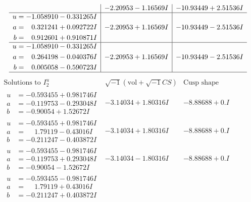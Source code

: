 \documentclass[1p]{elsarticle_modified}
\theoremstyle{definition}
\newcommand{\I}{\sqrt{-1}}
\begin{document}
$$\begin{array}{c|c|c}
 & -2.20953 - 1.16569 I & -10.93449 + 2.51536 I \\ \hline\begin{aligned}
u &= -1.058910 - 0.331265 I \\
a &= \phantom{-}0.321241 + 0.092722 I \\
b &= \phantom{-}0.912601 + 0.910871 I\end{aligned}
 & -2.20953 + 1.16569 I & -10.93449 - 2.51536 I \\ \hline\begin{aligned}
u &= -1.058910 - 0.331265 I \\
a &= \phantom{-}0.264198 - 0.040376 I \\
b &= \phantom{-}0.005058 - 0.590723 I\end{aligned}
 & -2.20953 + 1.16569 I & -10.93449 - 2.51536 I\\
 \hline 
 \end{array}$$\newpage$$\begin{array}{c|c|c}  
\text{Solutions to }I^u_{2}& \I (\text{vol} + \sqrt{-1}CS) & \text{Cusp shape}\\
 \hline 
\begin{aligned}
u &= -0.593455 + 0.981746 I \\
a &= -0.119753 - 0.293048 I \\
b &= -0.90054 + 1.52672 I\end{aligned}
 & -3.14034 + 1.80316 I & -8.88688 + 0. I\phantom{ +0.000000I} \\ \hline\begin{aligned}
u &= -0.593455 + 0.981746 I \\
a &= \phantom{-}1.79119 - 0.43016 I \\
b &= -0.211247 - 0.403872 I\end{aligned}
 & -3.14034 + 1.80316 I & -8.88688 + 0. I\phantom{ +0.000000I} \\ \hline\begin{aligned}
u &= -0.593455 - 0.981746 I \\
a &= -0.119753 + 0.293048 I \\
b &= -0.90054 - 1.52672 I\end{aligned}
 & -3.14034 - 1.80316 I & -8.88688 + 0. I\phantom{ +0.000000I} \\ \hline\begin{aligned}
u &= -0.593455 - 0.981746 I \\
a &= \phantom{-}1.79119 + 0.43016 I \\
b &= -0.211247 + 0.403872 I\end{aligned}

\end{array}$$
\end{document}
